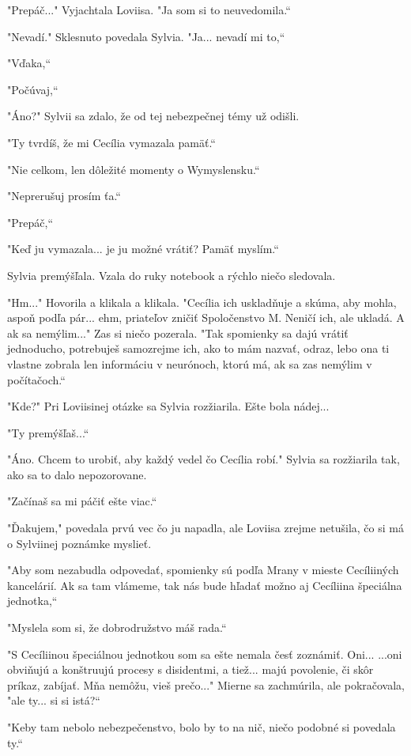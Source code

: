 \documentclass{book}
\begin{document}
"$ $Prepáč..."$ $ Vyjachtala Loviisa. "$ $Ja som si to neuvedomila.“

"$ $Nevadí."$ $ Sklesnuto povedala Sylvia. "$ $Ja... nevadí mi to,“

"$ $Vďaka,“

"$ $Počúvaj,“

"$ $Áno?"$ $ Sylvii sa zdalo, že od tej nebezpečnej témy už odišli.

"$ $Ty tvrdíš, že mi Cecília vymazala pamäť.“

"$ $Nie celkom, len dôležité momenty o Wymyslensku.“

"$ $Neprerušuj prosím ťa.“

"$ $Prepáč,“

"$ $Keď ju vymazala... je ju možné vrátiť? Pamäť myslím.“

Sylvia premýšľala. Vzala do ruky notebook a rýchlo niečo sledovala.

"$ $Hm..."$ $ Hovorila a klikala a klikala. "$ $Cecília ich uskladňuje a skúma, aby mohla, aspoň podľa pár... ehm, priateľov zničiť Spoločenstvo M. Neničí ich, ale ukladá. A ak sa nemýlim..."$ $ Zas si niečo pozerala. "$ $Tak spomienky sa dajú vrátiť jednoducho, potrebuješ samozrejme ich, ako to mám nazvať, odraz, lebo ona ti vlastne zobrala len informáciu v neurónoch, ktorú má, ak sa zas nemýlim v počítačoch.“

"$ $Kde?"$ $ Pri Loviisinej otázke sa Sylvia rozžiarila. Ešte bola nádej...

"$ $Ty premýšľaš...“

"$ $Áno. Chcem to urobiť, aby každý vedel čo Cecília robí."$ $ Sylvia sa rozžiarila tak, ako sa to dalo nepozorovane.

"$ $Začínaš sa mi páčiť ešte viac.“

"$ $Ďakujem,"$ $ povedala prvú vec čo ju napadla, ale Loviisa zrejme netušila, čo si má o Sylviinej poznámke myslieť.

"$ $Aby som nezabudla odpovedať, spomienky sú podľa Mrany v mieste Cecíliiných kancelárií. Ak sa tam vlámeme, tak nás bude hľadať možno aj Cecíliina špeciálna jednotka,“

"$ $Myslela som si, že dobrodružstvo máš rada.“

"$ $S Cecíliinou špeciálnou jednotkou som sa ešte nemala česť zoznámiť. Oni... ...oni obviňujú a konštruujú procesy s disidentmi, a tiež... majú povolenie, či skôr príkaz, zabíjať. Mňa nemôžu, vieš prečo..."$ $ Mierne sa zachmúrila, ale pokračovala, "$ $ale ty... si si istá?“

"$ $Keby tam nebolo nebezpečenstvo, bolo by to na nič, niečo podobné si povedala ty.“
\end{document}
